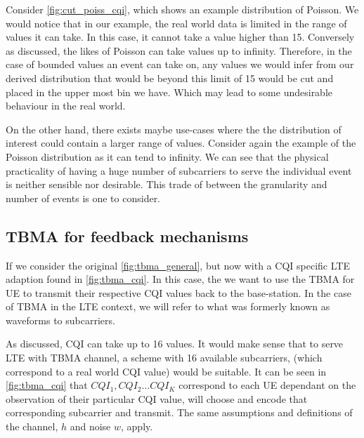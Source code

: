 \documentclass{article}
\begin{document}
Consider \cref{fig:cut_poiss_cqi}, which shows an example distribution of Poisson. We would notice that in our example, the real world data is limited in the range of values it can take. In this case, it cannot take a value higher than 15.  Conversely as discussed, the likes of Poisson can take values up to infinity. Therefore, in the case of bounded values an event can take on, any values we would infer from our derived distribution that would be beyond this limit of 15 would be cut and placed in the upper most bin we have. Which may lead to some undesirable behaviour in the real world. 

On the other hand, there exists maybe use-cases where the the distribution of interest could contain a larger range of values. Consider again the example of the Poisson distribution as it can tend to infinity. We can see that the physical practicality of having a huge number of subcarriers to serve the individual event is neither sensible nor desirable. This trade of between the granularity and number of events is one to consider.

\subsection{TBMA for feedback mechanisms}
If we consider the original \cref{fig:tbma_general}, but now with a \ac{CQI} specific LTE adaption found in \cref{fig:tbma_cqi}. In this case, the we want to use the \ac{TBMA} for \ac{UE} to transmit their respective \ac{CQI} values back to the base-station. In the case of \ac{TBMA} in the LTE context, we will refer to what was formerly known as waveforms to subcarriers.

As discussed, \ac{CQI} can take up to 16 values. It would make sense that to serve LTE  with \ac{TBMA} channel, a scheme with 16 available subcarriers, (which correspond to a real world CQI value) would be suitable. It can be seen in \cref{fig:tbma_cqi} that $CQI_{1},CQI_{2} \dots CQI_{K}$ correspond to each \ac{UE} dependant on the observation of their particular \ac{CQI} value, will choose and encode that corresponding subcarrier and transmit. The same assumptions and definitions of the channel, $h$ and noise $w$, apply.
\end{document}

